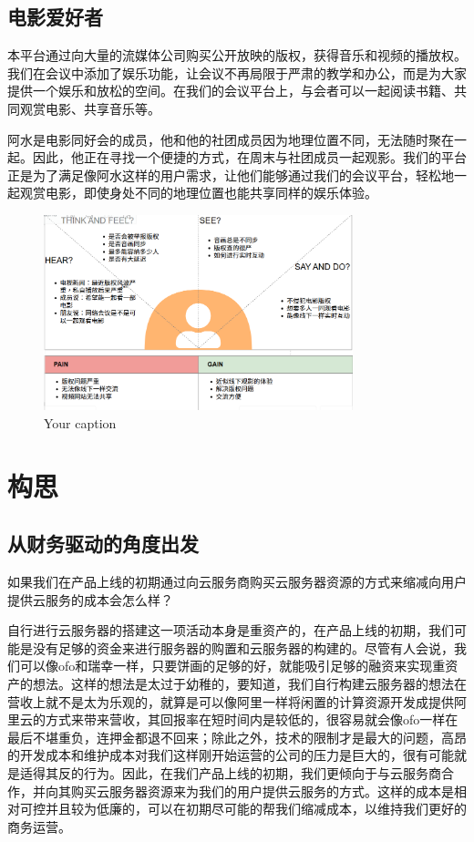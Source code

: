 \documentclass[a4paper,12pt]{article}
\begin{document}
    \subsection{电影爱好者}
    本平台通过向大量的流媒体公司购买公开放映的版权，获得音乐和视频的播放权。我们在会议中添加了娱乐功能，让会议不再局限于严肃的教学和办公，而是为大家提供一个娱乐和放松的空间。在我们的会议平台上，与会者可以一起阅读书籍、共同观赏电影、共享音乐等。

    阿水是电影同好会的成员，他和他的社团成员因为地理位置不同，无法随时聚在一起。因此，他正在寻找一个便捷的方式，在周末与社团成员一起观影。我们的平台正是为了满足像阿水这样的用户需求，让他们能够通过我们的会议平台，轻松地一起观赏电影，即使身处不同的地理位置也能共享同样的娱乐体验。
    \begin{figure}[h]
        \centering
        \includegraphics[width=0.8\textwidth]{电影爱好者移情图.png}
        \caption{Your caption}
    \end{figure}
    \clearpage

    \section{构思}
    \subsection{从财务驱动的角度出发}
    如果我们在产品上线的初期通过向云服务商购买云服务器资源的方式来缩减向用户提供云服务的成本会怎么样？

    自行进行云服务器的搭建这一项活动本身是重资产的，在产品上线的初期，我们可能是没有足够的资金来进行服务器的购置和云服务器的构建的。尽管有人会说，我们可以像ofo和瑞幸一样，只要饼画的足够的好，就能吸引足够的融资来实现重资产的想法。这样的想法是太过于幼稚的，要知道，我们自行构建云服务器的想法在营收上就不是太为乐观的，就算是可以像阿里一样将闲置的计算资源开发成提供阿里云的方式来带来营收，其回报率在短时间内是较低的，很容易就会像ofo一样在最后不堪重负，连押金都退不回来；除此之外，技术的限制才是最大的问题，高昂的开发成本和维护成本对我们这样刚开始运营的公司的压力是巨大的，很有可能就是适得其反的行为。因此，在我们产品上线的初期，我们更倾向于与云服务商合作，并向其购买云服务器资源来为我们的用户提供云服务的方式。这样的成本是相对可控并且较为低廉的，可以在初期尽可能的帮我们缩减成本，以维持我们更好的商务运营。
\end{document}
